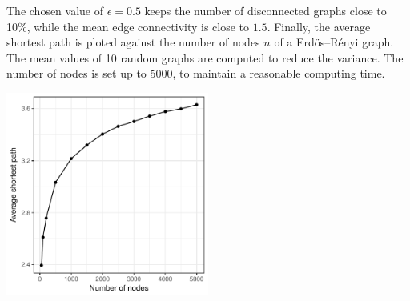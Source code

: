 \documentclass[a4paper]{article}
\begin{document}
The chosen value of $\epsilon = 0.5$ keeps the number of disconnected graphs 
close to 10\%, while the mean edge connectivity is close to $1.5$. Finally, the 
average shortest path is ploted against the number of nodes $n$ of a 
Erdös--Rényi graph. The mean values of 10 random graphs are computed to reduce 
the variance. The number of nodes is set up to 5000, to maintain a reasonable 
computing time.
%
\begin{center}
\includegraphics[width=0.5\textwidth]{er.pdf}
\end{center}
\end{document}
